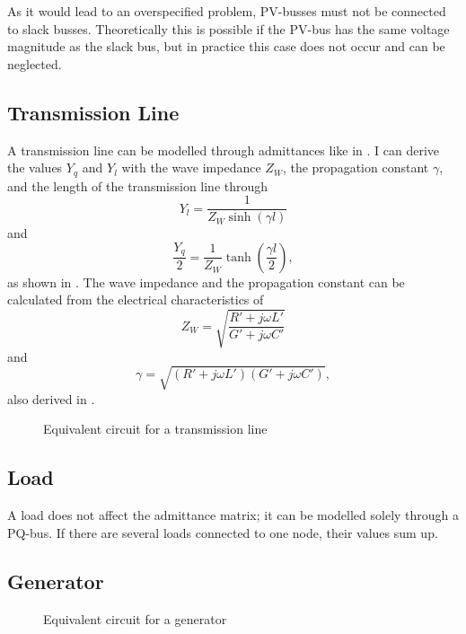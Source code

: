 As it would lead to an overspecified problem, PV-busses must not be connected to slack busses. Theoretically this is possible if the PV-bus has the same voltage magnitude as the slack bus, but in practice this case does not occur and can be neglected.

\subsection{Transmission Line}
A transmission line can be modelled through admittances like in . I can derive the values $Y_q$ and $Y_l$ with the wave impedance $Z_W$, the propagation constant $\gamma$, and the length of the transmission line through
\begin{equation}
	Y_l = \frac{1}{Z_W \sinh \left( \gamma l \right)}
\end{equation}
and
\begin{equation}
	\frac{Y_q}{2} = \frac{1}{Z_W} \tanh \left( \frac{\gamma l}{2} \right),
\end{equation}
as shown in \citep[p. 155]{powerSystemAnalysis}. The wave impedance and the propagation constant can be calculated from the electrical characteristics of
\begin{equation}
	Z_W = \sqrt{\frac{R' + j \omega L'}{G' + j \omega C'}}
\end{equation}
and 
\begin{equation}
	\gamma = \sqrt{\left( R' + j \omega L' \right) \left( G' + j \omega C' \right)},
\end{equation}
also derived in \citep[p. 153]{powerSystemAnalysis}.

\begin{figure}
	\centering
	
	\caption{Equivalent circuit for a transmission line}
	\label{fig:transmission_line}
\end{figure}

\subsection{Load}
A load does not affect the admittance matrix; it can be modelled solely through a PQ-bus. If there are several loads connected to one node, their values sum up.

\subsection{Generator}

\begin{figure}
	\centering
	
	\caption{Equivalent circuit for a generator}
	\label{fig:generator}
\end{figure}

